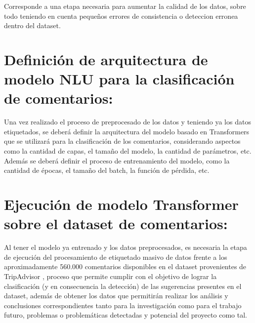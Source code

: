 Corresponde a una etapa necesaria para aumentar la calidad de los datos, sobre todo teniendo en cuenta pequeños errores de consistencia o deteccion erronea dentro del dataset.

\section{\textbf{Definición de arquitectura de modelo NLU para la clasificación de comentarios:}}

Una vez realizado el proceso de preprocesado de los datos y teniendo ya los datos etiquetados, se deberá definir la arquitectura del modelo basado en Transformers que se utilizará para la clasificación de los comentarios, considerando aspectos como la cantidad de capas, el tamaño del modelo, la cantidad de parámetros, etc. Además se deberá definir el proceso de entrenamiento del modelo, como la cantidad de épocas, el tamaño del batch, la función de pérdida, etc.


\section{\textbf{Ejecución de modelo Transformer sobre el dataset de comentarios:}}

Al tener el modelo ya entrenado y los datos preprocesados, es necesaria la etapa de ejecución del procesamiento de etiquetado masivo de datos frente a los aproximadamente 560.000 comentarios disponibles en el dataset provenientes de TripAdvisor \textcite{tripadvisor-website}, proceso que permite cumplir con el objetivo de lograr la clasificación (y en consecuencia la detección) de las sugerencias presentes en el dataset, además de obtener los datos que permitirán realizar los análisis y conclusiones correspondientes tanto para la investigación como para el trabajo futuro, problemas o problemáticas detectadas y potencial del proyecto como tal.


















